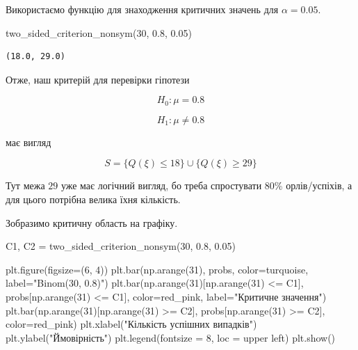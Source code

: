 \documentclass[
  letterpaper,
  10pt,
  openany]{report}
\newenvironment{Shaded}{\begin{snugshade}}{\end{snugshade}}
\newcommand{\DecValTok}[1]{\textcolor[rgb]{0.68,0.00,0.00}{#1}}
\newcommand{\FloatTok}[1]{\textcolor[rgb]{0.68,0.00,0.00}{#1}}
\newcommand{\NormalTok}[1]{\textcolor[rgb]{0.00,0.23,0.31}{#1}}
\newcommand{\OperatorTok}[1]{\textcolor[rgb]{0.37,0.37,0.37}{#1}}
\newcommand{\StringTok}[1]{\textcolor[rgb]{0.13,0.47,0.30}{#1}}
\theoremstyle{definition}
\theoremstyle{remark}
\begin{document}
Використаємо функцію для знаходження критичних значень для
\(\alpha = 0.05\).

\begin{Shaded}
\begin{Highlighting}[]
\NormalTok{two\_sided\_criterion\_nonsym(}\DecValTok{30}\NormalTok{, }\FloatTok{0.8}\NormalTok{, }\FloatTok{0.05}\NormalTok{)}
\end{Highlighting}
\end{Shaded}

\begin{verbatim}
(18.0, 29.0)
\end{verbatim}

Отже, наш критерій для перевірки гіпотези

\[
H_0: \mu = 0.8
\]

\[
H_1: \mu \neq 0.8
\]

має вигляд

\[
S = \{Q(\xi) \leqslant 18\} \cup \{Q(\xi) \geqslant 29\}
\]

Тут межа \(29\) уже має логічний вигляд, бо треба спростувати 80\%
орлів/успіхів, а для цього потрібна велика їхня кількість.

Зобразимо критичну область на графіку.

\begin{Shaded}
\begin{Highlighting}[]
\NormalTok{C1, C2 }\OperatorTok{=}\NormalTok{ two\_sided\_criterion\_nonsym(}\DecValTok{30}\NormalTok{, }\FloatTok{0.8}\NormalTok{, }\FloatTok{0.05}\NormalTok{)}

\NormalTok{plt.figure(figsize}\OperatorTok{=}\NormalTok{(}\DecValTok{6}\NormalTok{, }\DecValTok{4}\NormalTok{))}
\NormalTok{plt.bar(np.arange(}\DecValTok{31}\NormalTok{), probs, color}\OperatorTok{=}\NormalTok{turquoise, label}\OperatorTok{=}\StringTok{"Binom(30, 0.8)"}\NormalTok{)}
\NormalTok{plt.bar(np.arange(}\DecValTok{31}\NormalTok{)[np.arange(}\DecValTok{31}\NormalTok{) }\OperatorTok{\textless{}=}\NormalTok{ C1], probs[np.arange(}\DecValTok{31}\NormalTok{) }\OperatorTok{\textless{}=}\NormalTok{ C1], color}\OperatorTok{=}\NormalTok{red\_pink, label}\OperatorTok{=}\StringTok{"Критичне значення"}\NormalTok{)}
\NormalTok{plt.bar(np.arange(}\DecValTok{31}\NormalTok{)[np.arange(}\DecValTok{31}\NormalTok{) }\OperatorTok{\textgreater{}=}\NormalTok{ C2], probs[np.arange(}\DecValTok{31}\NormalTok{) }\OperatorTok{\textgreater{}=}\NormalTok{ C2], color}\OperatorTok{=}\NormalTok{red\_pink)}
\NormalTok{plt.xlabel(}\StringTok{"Кількість успішних випадків"}\NormalTok{)}
\NormalTok{plt.ylabel(}\StringTok{"Ймовірність"}\NormalTok{)}
\NormalTok{plt.legend(fontsize }\OperatorTok{=} \StringTok{\textquotesingle{}8\textquotesingle{}}\NormalTok{, loc }\OperatorTok{=} \StringTok{\textquotesingle{}upper left\textquotesingle{}}\NormalTok{)}
\NormalTok{plt.show()}
\end{Highlighting}
\end{Shaded}
\end{document}
